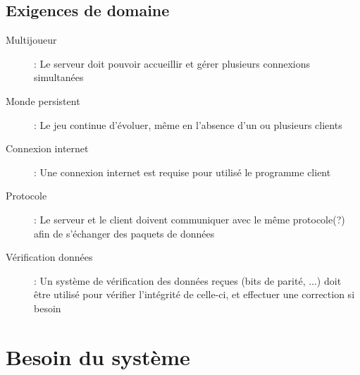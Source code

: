 \documentclass[a4paper]{article}
\begin{document}
\subsection{Exigences de domaine}
\begin{description}
\item[Multijoueur] : Le serveur doit pouvoir accueillir et gérer plusieurs connexions simultanées
\item[Monde persistent] : Le jeu continue d'évoluer, même en l'absence d'un ou plusieurs clients
\item[Connexion internet] : Une connexion internet est requise pour utilisé le programme client
\item[Protocole] : Le serveur et le client doivent communiquer avec le même protocole(?) afin de s'échanger des paquets de données
\item[Vérification données] : Un système de vérification des données reçues (bits de parité, ...) doit être utilisé pour vérifier l'intégrité de celle-ci, et effectuer une correction si besoin
\end{description}

\section{Besoin du système}
\end{document}

